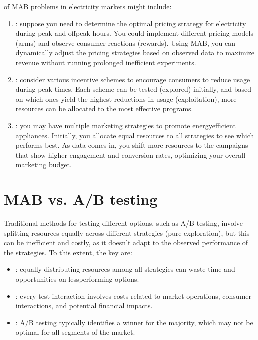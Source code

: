 \documentclass[letterpaper,10pt,english]{jupyterBook}
\begin{document}
\sphinxAtStartPar
{} of MAB problems in electricity markets might include:
\begin{enumerate}
%
\item {} 
\sphinxAtStartPar
{}: suppose you need to determine the optimal pricing strategy for electricity during peak and off\sphinxhyphen{}peak hours. You could implement different pricing models (arms) and observe consumer reactions (rewards). Using MAB, you can dynamically adjust the pricing strategies based on observed data to maximize revenue without running prolonged inefficient experiments.

\item {} 
\sphinxAtStartPar
{}: consider various incentive schemes to encourage consumers to reduce usage during peak times. Each scheme can be tested (explored) initially, and based on which ones yield the highest reductions in usage (exploitation), more resources can be allocated to the most effective programs.

\item {} 
\sphinxAtStartPar
{}: you may have multiple marketing strategies to promote energy\sphinxhyphen{}efficient appliances. Initially, you allocate equal resources to all strategies to see which performs best. As data comes in, you shift more resources to the campaigns that show higher engagement and conversion rates, optimizing your overall marketing budget.

\end{enumerate}


\section{MAB vs. A/B testing}
\label{\detokenize{notebooks/bandits:mab-vs-a-b-testing}}
\sphinxAtStartPar
Traditional methods for testing different options, such as A/B testing, involve splitting resources equally across different strategies (pure exploration), but this can be inefficient and costly, as it doesn’t adapt to the observed performance of the strategies. To this extent, the key  are:
\begin{itemize}
\item {} 
\sphinxAtStartPar
{}: equally distributing resources among all strategies can waste time and opportunities on less\sphinxhyphen{}performing options.

\item {} 
\sphinxAtStartPar
{}: every test interaction involves costs related to market operations, consumer interactions, and potential financial impacts.

\item {} 
\sphinxAtStartPar
{}: A/B testing typically identifies a winner for the majority, which may not be optimal for all segments of the market.

\end{itemize}
\end{document}
